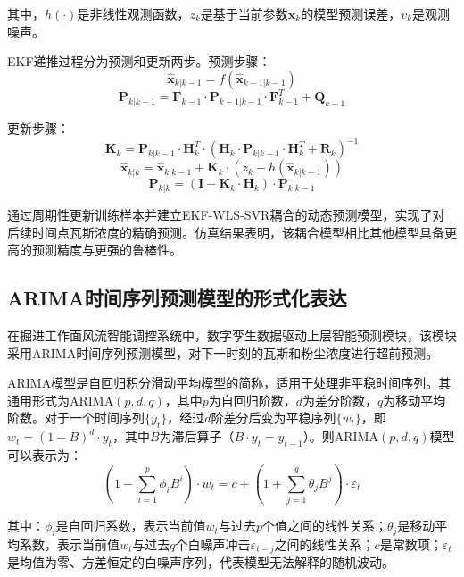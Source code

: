 \documentclass[twocolumn,a4paper]{ctexart}
\numberwithin{equation}{section}
\begin{document}
其中，$h(\cdot)$是非线性观测函数，$z_k$是基于当前参数$\bm{x}_k$的模型预测误差，$v_k$是观测噪声。

EKF递推过程分为预测和更新两步。预测步骤：
\begin{equation}
\hat{\bm{x}}_{k|k-1} = f(\hat{\bm{x}}_{k-1|k-1})
\end{equation}
\begin{equation}
\bm{P}_{k|k-1} = \bm{F}_{k-1} \cdot \bm{P}_{k-1|k-1} \cdot \bm{F}_{k-1}^T + \bm{Q}_{k-1}
\end{equation}

更新步骤：
\begin{equation}
\bm{K}_k = \bm{P}_{k|k-1} \cdot \bm{H}_k^T \cdot (\bm{H}_k \cdot \bm{P}_{k|k-1} \cdot \bm{H}_k^T + \bm{R}_k)^{-1}
\end{equation}
\begin{equation}
\hat{\bm{x}}_{k|k} = \hat{\bm{x}}_{k|k-1} + \bm{K}_k \cdot (z_k - h(\hat{\bm{x}}_{k|k-1}))
\end{equation}
\begin{equation}
\bm{P}_{k|k} = (\bm{I} - \bm{K}_k \cdot \bm{H}_k) \cdot \bm{P}_{k|k-1}
\end{equation}

通过周期性更新训练样本并建立EKF-WLS-SVR耦合的动态预测模型，实现了对后续时间点瓦斯浓度的精确预测。仿真结果表明，该耦合模型相比其他模型具备更高的预测精度与更强的鲁棒性。

\subsection{ARIMA时间序列预测模型的形式化表达}

在掘进工作面风流智能调控系统中，数字孪生数据驱动上层智能预测模块，该模块采用ARIMA时间序列预测模型，对下一时刻的瓦斯和粉尘浓度进行超前预测。

ARIMA模型是自回归积分滑动平均模型的简称，适用于处理非平稳时间序列。其通用形式为ARIMA$(p,d,q)$，其中$p$为自回归阶数，$d$为差分阶数，$q$为移动平均阶数。对于一个时间序列$\{y_t\}$，经过$d$阶差分后变为平稳序列$\{w_t\}$，即$w_t=(1-B)^d \cdot y_t$，其中$B$为滞后算子（$B \cdot y_t=y_{t-1}$）。则ARIMA$(p,d,q)$模型可以表示为：
\begin{equation}
\left(1-\sum_{i=1}^{p}\phi_i B^i\right) \cdot w_t = c + \left(1+\sum_{j=1}^{q}\theta_j B^j\right) \cdot \varepsilon_t
\end{equation}

其中：$\phi_i$是自回归系数，表示当前值$w_t$与过去$p$个值之间的线性关系；$\theta_j$是移动平均系数，表示当前值$w_t$与过去$q$个白噪声冲击$\varepsilon_{t-j}$之间的线性关系；$c$是常数项；$\varepsilon_t$是均值为零、方差恒定的白噪声序列，代表模型无法解释的随机波动。
\end{document}
